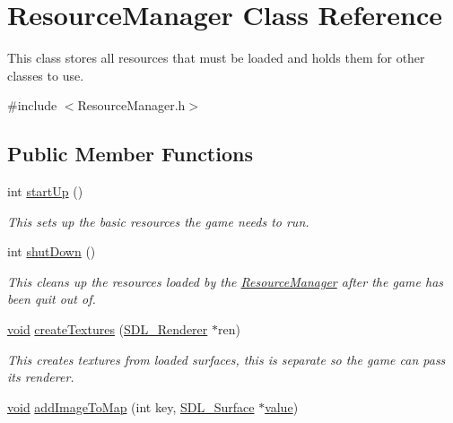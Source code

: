 \hypertarget{class_resource_manager}{}\section{Resource\+Manager Class Reference}
\label{class_resource_manager}


This class stores all resources that must be loaded and holds them for other classes to use.  




{\ttfamily \#include $<$Resource\+Manager.\+h$>$}

\subsection*{Public Member Functions}
\begin{DoxyCompactItemize}
\item 
int \mbox{\hyperlink{class_resource_manager_a53bf358b029e050a285725bc70a8550a}{start\+Up}} ()
\begin{DoxyCompactList}\small\item\em This sets up the basic resources the game needs to run. \end{DoxyCompactList}\item 
int \mbox{\hyperlink{class_resource_manager_ab8d9779f5f957610d272525cc32a775e}{shut\+Down}} ()
\begin{DoxyCompactList}\small\item\em This cleans up the resources loaded by the \mbox{\hyperlink{class_resource_manager}{Resource\+Manager}} after the game has been quit out of. \end{DoxyCompactList}\item 
\mbox{\hyperlink{_s_d_l__opengles2__gl2ext_8h_ae5d8fa23ad07c48bb609509eae494c95}{void}} \mbox{\hyperlink{class_resource_manager_ad1cad583428596c69f9190acb291b02a}{create\+Textures}} (\mbox{\hyperlink{_s_d_l__render_8h_aaf0bf7d020754fc614fe06552ea4d5d4}{S\+D\+L\+\_\+\+Renderer}} $\ast$ren)
\begin{DoxyCompactList}\small\item\em This creates textures from loaded surfaces, this is separate so the game can pass its renderer. \end{DoxyCompactList}\item 
\mbox{\hyperlink{_s_d_l__opengles2__gl2ext_8h_ae5d8fa23ad07c48bb609509eae494c95}{void}} \mbox{\hyperlink{class_resource_manager_a7c4cd552ec084d3cf40906e46a2d3629}{add\+Image\+To\+Map}} (int key, \mbox{\hyperlink{struct_s_d_l___surface}{S\+D\+L\+\_\+\+Surface}} $\ast$\mbox{\hyperlink{_s_d_l__opengl__glext_8h_a8ad81492d410ff2ac11f754f4042150f}{value}})

\end{DoxyCompactItemize}
